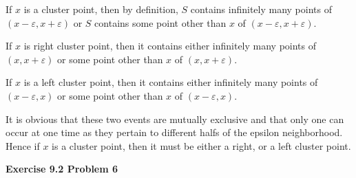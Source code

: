 \documentclass[addpoints]{exam}
\begin{document}
\begin{questions}
\begin{parts}
\begin{solution}
            If $x$ is a cluster point, then by definition, $S$ contains infinitely many points of $ (x - \varepsilon, x + \varepsilon) $ or $S$ contains some point other than $x$ of $ (x - \varepsilon, x + \varepsilon) $.

            If $x$ is right cluster point, then it contains either infinitely many points of $ (x, x + \varepsilon) $ or some point other than $x$ of $ (x, x + \varepsilon) $. 

            If $x$ is a left cluster point, then it contains either infinitely many points of $(x - \varepsilon, x)$ or some point other than $x$ of $ (x - \varepsilon, x) $. 
            
            It is obvious that these two events are mutually exclusive and that only one can occur at one time as they pertain to different halfs of the epsilon neighborhood. Hence if $x$ is a cluster point, then it must be either a right, or a left cluster point.
        \end{solution}
    \end{parts}
    
    \question
    \textbf{Exercise 9.2 Problem 6}
\end{questions}
\end{document}
